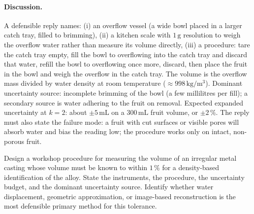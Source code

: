 \paragraph{Discussion.}
A defensible reply names: (i) an overflow vessel (a wide bowl placed
in a larger catch tray, filled to brimming), (ii) a kitchen scale
with $1 \,\si{\gram}$ resolution to weigh the overflow water rather
than measure its volume directly, (iii) a procedure: tare the catch
tray empty, fill the bowl to overflowing into the catch tray and
discard that water, refill the bowl to overflowing once more,
discard, then place the fruit in the bowl and weigh the overflow in
the catch tray. The volume is the overflow mass divided by water
density at room temperature ($\approx 998 \,\si{\kilogram\per\meter
\cubed}$). Dominant uncertainty source: incomplete brimming of the
bowl (a few millilitres per fill); a secondary source is water
adhering to the fruit on removal. Expected expanded uncertainty at
$k = 2$: about $\pm 5 \,\si{\milli\liter}$ on a $300 \,\si{\milli
\liter}$ fruit volume, or $\pm 2\,\%$. The reply must also state
the failure mode: a fruit with cut surfaces or visible pores will
absorb water and bias the reading low; the procedure works only on
intact, non-porous fruit.

\begin{exercise}
Design a workshop procedure for measuring the volume of an irregular
metal casting whose volume must be known to within $1\,\%$ for a
density-based identification of the alloy. State the instruments,
the procedure, the uncertainty budget, and the dominant uncertainty
source. Identify whether water displacement, geometric approximation,
or image-based reconstruction is the most defensible primary method
for this tolerance.
\end{exercise}

